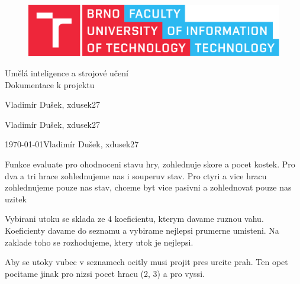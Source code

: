 \documentclass[11pt, a4paper, titlepage]{article}
\begin{document}
\begin{titlepage}
    \begin{center}
        \begin{figure}[htb]
            \centering
            \includegraphics[width=0.85\hsize]{images/fitlogo.pdf}
        \end{figure}
        {\Huge Umělá inteligence a strojové učení} \\
        \bigskip
        {\LARGE Dokumentace k projektu} \\
    \end{center}
    {\Large \hfill Vladimír Dušek, xdusek27}
    \medskip

    {\Large \hfill Vladimír Dušek, xdusek27}
    \medskip

    {\Large \today \hfill Vladimír Dušek, xdusek27}
\end{titlepage}


Funkce evaluate pro ohodnoceni stavu hry, zohlednuje skore a pocet kostek.
Pro dva a tri hrace zohlednujeme nas i souperuv stav.
Pro ctyri a vice hracu zohlednujeme pouze nas stav, chceme byt vice pasivni
a zohlednovat pouze nas uzitek

Vybirani utoku se sklada ze 4 koeficientu, kterym davame ruznou vahu.
Koeficienty davame do seznamu a vybirame nejlepsi prumerne umisteni.
Na zaklade toho se rozhodujeme, ktery utok je nejlepsi.

Aby se utoky vubec v seznamech ocitly musi projit pres urcite prah.
Ten opet pocitame jinak pro nizsi pocet hracu (2, 3) a pro vyssi.

\end{document}
